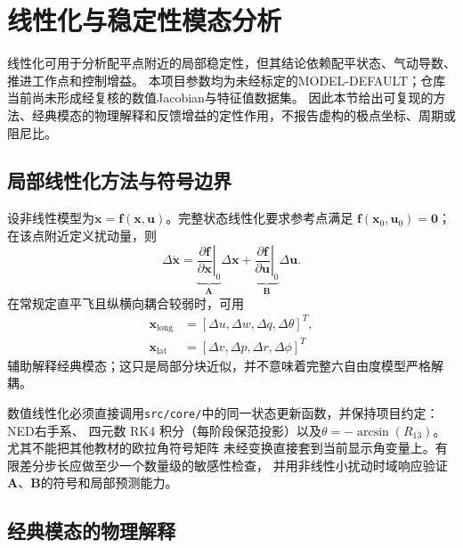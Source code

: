 \section{线性化与稳定性模态分析}
\label{sec:stability}

线性化可用于分析配平点附近的局部稳定性，但其结论依赖配平状态、气动导数、推进工作点和控制增益。
本项目参数均为未经标定的MODEL-DEFAULT；仓库当前尚未形成经复核的数值Jacobian与特征值数据集。
因此本节给出可复现的方法、经典模态的物理解释和反馈增益的定性作用，不报告虚构的极点坐标、周期或阻尼比。

\subsection{局部线性化方法与符号边界}

设非线性模型为$\dot{\bm{x}}=\bm{f}(\bm{x},\bm{u})$。完整状态线性化要求参考点满足
$\bm{f}(\bm{x}_0,\bm{u}_0)=\bm{0}$；在该点附近定义扰动量，则
\begin{equation}
    \Delta\dot{\bm{x}}
    = \underbrace{\left.\frac{\partial\bm{f}}{\partial\bm{x}}\right|_0}_{\bm{A}}
      \Delta\bm{x}
    + \underbrace{\left.\frac{\partial\bm{f}}{\partial\bm{u}}\right|_0}_{\bm{B}}
      \Delta\bm{u} .
    \label{eq:linear_state_space}
\end{equation}
在常规定直平飞且纵横向耦合较弱时，可用
\begin{align}
    \bm{x}_{\mathrm{long}} &= [\Delta u,\Delta w,\Delta q,\Delta\theta]^T,\\
    \bm{x}_{\mathrm{lat}}  &= [\Delta v,\Delta p,\Delta r,\Delta\phi]^T
\end{align}
辅助解释经典模态；这只是局部分块近似，并不意味着完整六自由度模型严格解耦。

数值线性化必须直接调用\texttt{src/core/}中的同一状态更新函数，并保持项目约定：NED右手系、
四元数 RK4 积分（每阶段保范投影）以及$\theta=-\arcsin(R_{13})$。尤其不能把其他教材的欧拉角符号矩阵
未经变换直接套到当前显示角变量上。有限差分步长应做至少一个数量级的敏感性检查，
并用非线性小扰动时域响应验证$\bm{A}$、$\bm{B}$的符号和局部预测能力。

\subsection{经典模态的物理解释}

